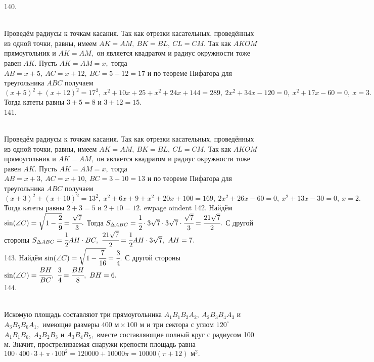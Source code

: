 140. \begin{figure}[ht!]
\end{figure}\\
Проведём радиусы к точкам касания. Так как отрезки касательных, проведённых из одной точки, равны, имеем $AK=AM,\ BK=BL,\ CL=CM.$ Так как $AKOM$ прямоугольник и $AK=AM,$ он является квадратом и радиус окружности тоже равен $AK.$ Пусть $AK=AM=x,$ тогда $AB=x+5,\ AC=x+12,\ BC=5+12=17$ и по теореме Пифагора для треугольника $ABC$ получаем $(x+5)^2+(x+12)^2=17^2,\ x^2+10x+25+x^2+24x+144=289,\ 2x^2+34x-120=0,\ x^2+17x-60=0,\ x=3.$ Тогда катеты равны $3+5=8$ и $3+12=15.$\\
141. \begin{figure}[ht!]
\end{figure}\\
Проведём радиусы к точкам касания. Так как отрезки касательных, проведённых из одной точки, равны, имеем $AK=AM,\ BK=BL,\ CL=CM.$ Так как $AKOM$ прямоугольник и $AK=AM,$ он является квадратом и радиус окружности тоже равен $AK.$ Пусть $AK=AM=x,$ тогда $AB=x+3,\ AC=x+10,\ BC=3+10=13$ и по теореме Пифагора для треугольника $ABC$ получаем $(x+3)^2+(x+10)^2=13^2,\ x^2+6x+9+x^2+20x+100=169,\ 2x^2+26x-60=0,\ x^2+13x-30=0,\ x=2.$ Тогда катеты равны $2+3=5$ и $2+10=12.$
ewpage
oindent
142. Найдём $\sin(\angle C)=\sqrt{1-\cfrac{2}{9}}=\cfrac{\sqrt{7}}{3}.$ Тогда $S_{\Delta ABC}=\cfrac{1}{2}\cdot3\sqrt{7}\cdot3\sqrt{7}\cdot\cfrac{\sqrt{7}}{3}=
\cfrac{21\sqrt{7}}{2}.$ С другой стороны $S_{\Delta ABC}=\cfrac{1}{2}AH\cdot BC,\ \cfrac{21\sqrt{7}}{2}=\cfrac{1}{2}AH\cdot3\sqrt{7},\ AH=7.$\\
143. Найдём $\sin(\angle C)=\sqrt{1-\cfrac{7}{16}}=\cfrac{3}{4}.$ С другой стороны $\sin(\angle C)=\cfrac{BH}{BC},\ \cfrac{3}{4}=\cfrac{BH}{8},\ BH=6.$ \\
144. \begin{figure}[ht!]
\end{figure}\\
Искомую площадь составляют три прямоугольника $A_1B_1B_2A_2,\ A_2B_3B_4A_3$ и $A_3B_5B_6A_1,$ имеющие размеры $400\text{ м}\times100\text{ м}$ и три сектора с углом $120^\circ$ $A_1B_1B_6,\ A_2B_2B_3$ и $A_3B_4B_5,$ вместе составляющие полный круг с радиусом 100 м. Значит, простреливаемая снаружи крепости площадь равна $100\cdot400\cdot3+\pi\cdot100^2=120000+10000\pi=10000(\pi+12)\text{ м}^2.$\\
